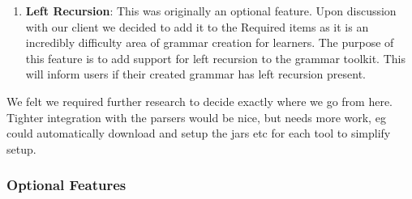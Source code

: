 \documentclass{l3proj}
\begin{document}
\begin{enumerate}
	\item \textbf{Left Recursion}:  This was originally an optional feature. Upon discussion with our client we decided to add it to the Required items as it is an incredibly difficulty area of grammar creation for learners. The purpose of this feature is to add support for left recursion to the grammar toolkit. This will inform users if their created grammar has left recursion present. 
\end {enumerate}
We felt we required further research to decide exactly where we go from here. Tighter integration with the parsers would be nice, but needs more work, eg could automatically download and setup the jars etc for each tool to simplify setup.

\subsubsection{Optional Features}
\end{document}
